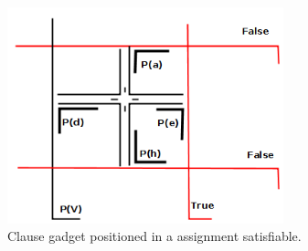 \begin{figure}[htb]	
\center%
\includegraphics[width=8cm]{./img/falsepieInGrid.png}
\caption{Clause gadget positioned in a assignment satisfiable.}
\label{fig:clausulagadgetgf}
\end{figure}
